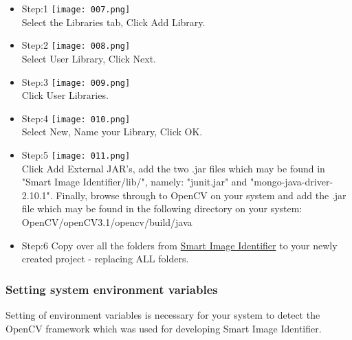 \documentclass[a4paper,12pt]{report}
\begin{document}
	\begin{itemize}
		\item Step:1	\linebreak
		\texttt{[image: 007.png]}\\
		\linebreak
		Select the Libraries tab, Click Add Library.
		\pagebreak
		\item Step:2	\linebreak
		\texttt{[image: 008.png]}\\ 
		\linebreak 
		Select User Library, Click Next.
		\item Step:3	\linebreak
		\texttt{[image: 009.png]}\\
		\linebreak
		Click User Libraries.
		\pagebreak
		\item Step:4	\linebreak
		\texttt{[image: 010.png]}\\
		\linebreak
		Select New, Name your Library, Click OK.
		\linebreak
		\item Step:5	\linebreak
		\texttt{[image: 011.png]}\\
		\linebreak
		Click Add External JAR's, add the two .jar files which may be found in "Smart Image Identifier/lib/", namely: "junit.jar" and "mongo-java-driver-2.10.1".
		\linebreak\linebreak
		Finally, browse through to OpenCV on your system and add the .jar file which may be found in the following directory on your system: OpenCV/openCV3.1/opencv/build/java		
		\pagebreak
		\item Step:6	\linebreak
		Copy over all the folders from \href{https://github.com/StephenSwanepoel/Ambitious-Designs/tree/master/Smart\%20Image\%20Identifier}{Smart Image Identifier} to your newly created project - replacing ALL folders.
		
		
	\end{itemize}
	
	
	\subsubsection{Setting system environment variables}
	Setting of environment variables is necessary for your system to detect the OpenCV framework
	which was used for developing Smart Image Identifier.
		
\end{document}

